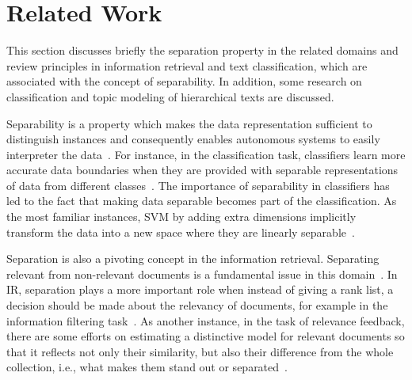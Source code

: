 \section{Related Work}
This section discusses briefly the separation property in the related domains and review principles in information retrieval and text classification, which are associated with the concept of separability.  
In addition, some research on classification and topic modeling of hierarchical texts are discussed. 

Separability is a property which makes the data representation sufficient to distinguish instances and consequently enables autonomous systems to easily interpreter the data~\citep{Lewis:1992}. For instance, in the classification task, classifiers learn more accurate data boundaries when they are provided with separable representations of data from different classes~\citep{Lewis:1995}. The importance of separability in classifiers has led to the fact that making data separable becomes part of the classification. As the most familiar instances, SVM by adding extra dimensions implicitly transform the data into a new space where they are linearly separable~\citep{Burges:1998}.

Separation is also a pivoting concept in the information retrieval. Separating relevant from non-relevant documents is a fundamental issue in this domain~\citep{Robertson:1977,saracevic:1975,Lavrenko:2001}. In IR, separation plays a more important role when instead of giving a rank list, a decision should be made about the relevancy of documents, for example in the information filtering task~\citep{Lewis:1992}. As another instance, in the task of relevance feedback, there are some efforts on estimating a distinctive model for relevant documents so that it reflects not only  their similarity, but also their difference from the whole collection, i.e., what makes them stand out or separated~\citep{Sparck:2003,Hiemstra:2004,Zhai:SMM:2001}. 

